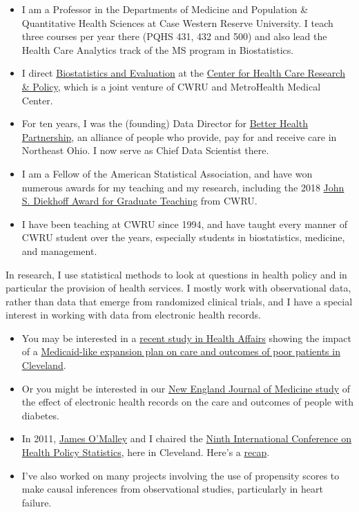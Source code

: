 \documentclass[
]{book}
\providecommand{\tightlist}{%
  \setlength{\itemsep}{0pt}\setlength{\parskip}{0pt}}
\begin{document}
\begin{itemize}
\tightlist
\item
  I am a Professor in the Departments of Medicine and Population \& Quantitative Health Sciences at Case Western Reserve University. I teach three courses per year there (PQHS 431, 432 and 500) and also lead the Health Care Analytics track of the MS program in Biostatistics.
\item
  I direct \href{http://chrp.org/biostatistics-evaluation/}{Biostatistics and Evaluation} at the \href{http://chrp.org/}{Center for Health Care Research \& Policy}, which is a joint venture of CWRU and MetroHealth Medical Center.
\item
  For ten years, I was the (founding) Data Director for \href{http://betterhealthpartnership.org/}{Better Health Partnership}, an alliance of people who provide, pay for and receive care in Northeast Ohio. I now serve as Chief Data Scientist there.
\item
  I am a Fellow of the American Statistical Association, and have won numerous awards for my teaching and my research, including the 2018 \href{https://students.case.edu/traditions/awards/diekhoff/}{John S. Diekhoff Award for Graduate Teaching} from CWRU.
\item
  I have been teaching at CWRU since 1994, and have taught every manner of CWRU student over the years, especially students in biostatistics, medicine, and management.
\end{itemize}

In research, I use statistical methods to look at questions in health policy and in particular the provision of health services. I mostly work with observational data, rather than data that emerge from randomized clinical trials, and I have a special interest in working with data from electronic health records.

\begin{itemize}
\tightlist
\item
  You may be interested in a \href{http://content.healthaffairs.org/content/34/7/1121.abstract}{recent study in Health Affairs} showing the impact of a \href{http://thedaily.case.edu/new-study-shows-prepared-safety-net-improves-care-saves-money-in-medicaid-expansion-population/}{Medicaid-like expansion plan on care and outcomes of poor patients in Cleveland}.
\item
  Or you might be interested in our \href{http://www.nejm.org/doi/full/10.1056/NEJMsa1102519}{New England Journal of Medicine study} of the effect of electronic health records on the care and outcomes of people with diabetes.
\item
  In 2011, \href{http://tdi.dartmouth.edu/faculty/a-james-omalley-phd}{James O'Malley} and I chaired the \href{https://ww2.amstat.org/meetings/ichps/2011/index.cfm?fuseaction=main}{Ninth International Conference on Health Policy Statistics}, here in Cleveland. Here's a \href{https://link.springer.com/article/10.1007\%2Fs10742-012-0096-8}{recap}.
\item
  I've also worked on many projects involving the use of propensity scores to make causal inferences from observational studies, particularly in heart failure.
\end{itemize}
\end{document}
